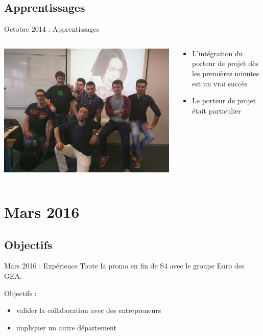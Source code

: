 \documentclass{beamer}
\begin{document}
\subsection{Apprentissages}
\begin{frame}{Octobre 2014 : Apprentissages}
  \begin{columns}
    \begin{column}{0.5\textwidth}
      \begin{center}
        \includegraphics[width=\textwidth]{includes/201510_ausecours.jpg}      
      \end{center}
    \end{column}
    \begin{column}{0.5\textwidth}
      \begin{itemize}
        \item L'intégration du porteur de projet dès les premières minutes est un vrai succès
        \item Le porteur de projet était particulier
      \end{itemize}
    \end{column}
  \end{columns}
\end{frame}

\section{Mars 2016}
\subsection{Objectifs}
\begin{frame}{Mars 2016 : Expérience}
  Toute la promo en fin de S4 avec le groupe Euro des GEA.

  Objectifs : 
  \begin{itemize}
    \item valider la collaboration avec des entrepreneurs
    \item impliquer un autre département
  \end{itemize}
\end{frame}
\end{document}

